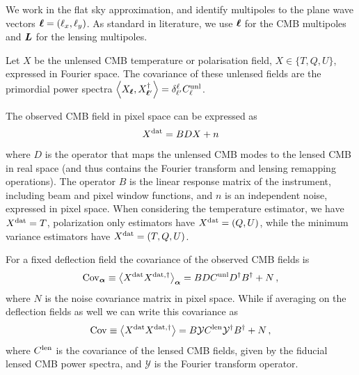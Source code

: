 \documentclass[prd, superscriptaddress, tightenlines, longbibliography, nofootinbib, eqsecnum, amsfonts, amsmath, floatfix, twocolumn, notitlepage]{revtex4-2}
\newcommand{\Cov}[0]{ {\rm{Cov}} }
\begin{document}
We work in the flat sky approximation, and identify multipoles to the plane wave vectors ${\boldsymbol{\ell}} = (\ell_x, \ell_y)$.
As standard in literature, we use ${\boldsymbol{\ell}}$ for the CMB multipoles and ${\mbox{\boldmath{$L$}}}$ for the lensing multipoles.   

Let $X$ be the unlensed CMB temperature or polarisation field, $X \in \{T, Q, U\}$, expressed in Fourier space.
The covariance of these unlensed fields are the primordial power spectra 
$\left<X_{{\boldsymbol{\ell}}}, X_{{\boldsymbol{\ell}}'}^\dagger \right> = \delta^{\ell}_{\ell'} C_\ell^{\rm unl}$.

The observed CMB field in pixel space can be expressed as 
\begin{equation}
    X^{\rm dat} = BDX + n
\end{equation}
where $D$ is the operator that maps the unlensed CMB modes to the lensed CMB in real space (and thus contains the Fourier transform and lensing remapping operations). The operator $B$ is the linear response matrix of the instrument, including beam and pixel window functions, and $n$ is an independent noise, expressed in pixel space.
When considering the temperature estimator, we have $ X^{\rm dat} = T$, polarization only estimators have $ X^{\rm dat} = (Q, U)$, while the minimum variance estimators have  $X^{\rm dat} = (T, Q, U)$.

For a fixed deflection field the covariance of the observed CMB fields is
\begin{equation}
    \Cov_{\valpha} \equiv \left<X^{\rm dat} X^{\rm dat, \dagger} \right>_{\valpha}  = BDC^{\rm unl} D^\dagger B^\dagger + N \, ,
\end{equation}
where $N$ is the noise covariance matrix in pixel space. 
While if averaging on the deflection fields as well we can write this covariance as 
\begin{equation}
    \Cov \equiv \left<X^{\rm dat} X^{\rm dat, \dagger} \right> = B \mathcal{Y} C^{\rm len} \mathcal{Y}^\dagger B^\dagger + N \, ,
\end{equation}
where $C^{\rm len}$ is the covariance of the lensed CMB fields, given by the fiducial lensed CMB power spectra, and $\mathcal{Y}$ is the Fourier transform operator.
\end{document}
